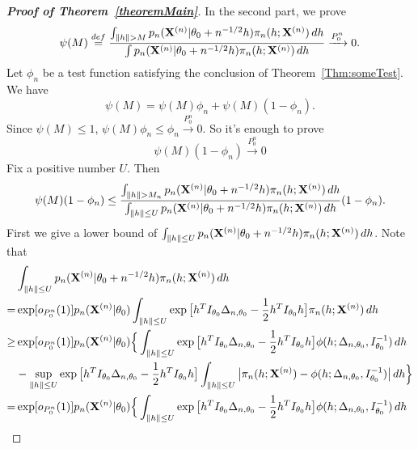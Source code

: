 \documentclass[3p]{elsarticle}
\theoremstyle{plain}
\theoremstyle{definition}
\theoremstyle{remark}
\begin{document}
\begin{proof}[\textbf{Proof of Theorem~\ref{theoremMain}}]
In the second part, we prove
\begin{equation}\label{eq:4}
    \psi(M)\overset{def}{=}\frac{\int_{\|h\|> M}p_n(\BX^{(n)}|\theta_0+n^{-1/2}h)\pi_n(h;\BX^{(n)})\, dh}{\int p_n(\BX^{(n)}|\theta_0+n^{-1/2}h)\pi_n(h;\BX^{(n)})\, dh}
    \xrightarrow{P_0^n}0.
\end{equation}
    Let $\phi_n$ be a test function satisfying the conclusion of Theorem~\ref{Thm:someTest}. We have
\begin{equation*}
    \psi(M)
    = 
    \psi(M)\phi_n
    +
    \psi(M)(1-\phi_n).
\end{equation*}
    Since $\psi(M)\leq 1$, 
    $
    \psi(M)\phi_n\leq \phi_n\xrightarrow{P_0^n}0
    $.
So it's enough to prove
\begin{equation*}
    \psi(M)(1-\phi_n)\xrightarrow{P_0^n}0
\end{equation*}
Fix a positive number $U$. Then
\begin{equation}\label{eq:11}
\psi(M)(1-\phi_n)
    \leq \frac{\int_{\|h\|>M_n}p_n(\BX^{(n)}|\theta_0+n^{-1/2}h)\pi_n(h;\BX^{(n)})\, dh}{\int_{\|h\|\leq U} p_n(\BX^{(n)}|\theta_0+n^{-1/2}h)\pi_n(h;\BX^{(n)})\, dh}(1-\phi_n).
\end{equation}
    First we give a lower bound of $\int_{\|h\|\leq U} p_n(\mathbf{X}^{(n)}|\theta_0+n^{-1/2}h)\pi_n(h;\mathbf{X}^{(n)})\, dh$.
 Note that
\begin{equation*}
    \begin{aligned}
        &\int_{\|h\|\leq U} p_n(\BX^{(n)}|\theta_0+n^{-1/2}h)\pi_n(h;\BX^{(n)})\, dh
\\
        = &
        \exp[o_{P_0^n}(1)]
        p_n(\BX^{(n)}|\theta_0)
        \int_{\|h\|\leq U}\exp\big[ h^T I_{\theta_0}\Delta_{n,\theta_0}-\frac{1}{2}h^T I_{\theta_0} h\big]\pi_n(h;\BX^{(n)})\, dh
        \\
        \geq &
        \exp[o_{P_0^n}(1)]
        p_n(\BX^{(n)}|\theta_0)
        \Big\{
            \int_{\|h\|\leq U}\exp\big[ h^T I_{\theta_0}\Delta_{n,\theta_0}-\frac{1}{2}h^T I_{\theta_0} h\big]\phi(h;\Delta_{n,\theta_0},I_{\theta_0}^{-1})\, dh
            \\
            &-
            \sup_{\|h\|\leq U}\exp\big[ h^T I_{\theta_0}\Delta_{n,\theta_0}-\frac{1}{2}h^T I_{\theta_0} h\big]
            \int_{\|h\|\leq U}\big|\pi_n(h;\BX^{(n)})-\phi(h;\Delta_{n,\theta_0},I_{\theta_0}^{-1})\big|\, dh
            \Big\}
        \\
        = &
        \exp[o_{P_0^n}(1)]
        p_n(\BX^{(n)}|\theta_0)
        \Big\{
            \int_{\|h\|\leq U}\exp\big[ h^T I_{\theta_0}\Delta_{n,\theta_0}-\frac{1}{2}h^T I_{\theta_0} h\big]\phi(h;\Delta_{n,\theta_0},I_{\theta_0}^{-1})\, dh

\end{aligned}
\end{equation*}
\end{proof}
\end{document}

